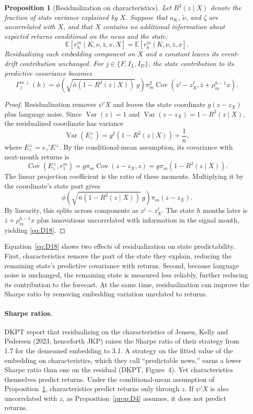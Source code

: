 \documentclass[11pt,letterpaper]{article}
\newtheorem{proposition}{Proposition}
\theoremstyle{remark}
\DeclareMathOperator{\Var}{Var}
\DeclareMathOperator{\Cov}{Cov}
\begin{document}
\begin{proposition}[Residualization on characteristics]\label{prop:D3}
Let $R^2(z\mid X)$ denote the fraction of state variance explained by $X$. Suppose that $a_K$, $\tilde\nu$, and $\zeta$ are uncorrelated with $X$, and that $X$ contains no additional information about expected returns conditional on the news and the state:
\[
\mathbb E[r_h^m\mid K,\nu,\bar z,x,X]
=\mathbb E[r_h^m\mid K,\nu,\bar z,x].
\]
Residualizing each embedding component on $X$ and a constant leaves its event-drift contribution unchanged. For $j\in\{F,I_L,I_D\}$, the state contribution to its predictive covariance becomes
\begin{equation}\label{eq:D18}
\Gamma_j^{m\perp}(h)
=\phi\left(\sqrt{\bar n(1-R^2(z\mid X))}\,g\right)
\pi_m^2
\Cov\left(z^j-z_X^j,\bar z+\rho_m^{h-1}x\right).
\end{equation}
\end{proposition}

\begin{proof}
Residualization removes $\psi'X$ and leaves the state coordinate $g(z-z_X)$ plus language noise. Since $\Var(z)=1$ and $\Var(z-z_X)=1-R^2(z\mid X)$, the residualized coordinate has variance
\[
\Var(E_z^\perp)
=g^2(1-R^2(z\mid X))+\frac{1}{\bar n},
\]
where $E_z^\perp=e_z'E^\perp$. By the conditional-mean assumption, its covariance with next-month returns is
\[
\Cov(E_z^\perp,r_1^m)
=g\pi_m\Cov(z-z_X,z)
=g\pi_m(1-R^2(z\mid X)).
\]
The linear projection coefficient is the ratio of these moments. Multiplying it by the coordinate's state part gives
\[
\phi\left(\sqrt{\bar n(1-R^2(z\mid X))}\,g\right)
\pi_m(z-z_X).
\]
By linearity, this splits across components as $z^j-z_X^j$. The state $h$ months later is $\bar z+\rho_m^{h-1}x$ plus innovations uncorrelated with information in the signal month, yielding \eqref{eq:D18}.
\end{proof}

Equation~\eqref{eq:D18} shows two effects of residualization on state predictability. First, characteristics remove the part of the state they explain, reducing the remaining state's predictive covariance with returns. Second, because language noise is unchanged, the remaining state is measured less reliably, further reducing its contribution to the forecast. At the same time, residualization can improve the Sharpe ratio by removing embedding variation unrelated to returns.

\paragraph{Sharpe ratios.} DKPT report that residualizing on the characteristics of Jensen, Kelly and Pedersen (2023, henceforth JKP) raises the Sharpe ratio of their strategy from 1.7 for the demeaned embedding to 3.1. A strategy on the fitted value of the embedding on characteristics, which they call ``predictable news,'' earns a lower Sharpe ratio than one on the residual (DKPT, Figure~4). Yet characteristics themselves predict returns. Under the conditional-mean assumption of Proposition~\ref{prop:D3}, characteristics predict returns only through $z$. If $\psi'X$ is also uncorrelated with $z$, as Proposition~\ref{prop:D4} assumes, it does not predict returns.
\end{document}
